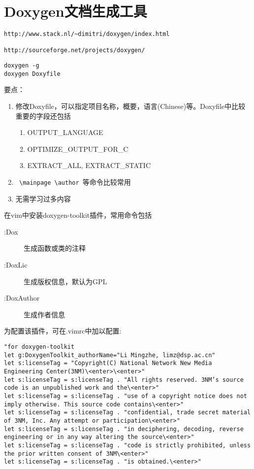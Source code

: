 \section{Doxygen文档生成工具}
\begin{verbatim}
http://www.stack.nl/~dimitri/doxygen/index.html

http://sourceforge.net/projects/doxygen/
\end{verbatim}

\begin{lstlisting}
doxygen -g
doxygen Doxyfile
\end{lstlisting}

要点：
\begin{enumerate}
	\item 修改Doxyfile，可以指定项目名称，概要，语言(Chinese)等。Doxyfile中比较重要的字段还包括
	\begin{enumerate}
		\item OUTPUT\_LANGUAGE
		\item OPTIMIZE\_OUTPUT\_FOR\_C
		\item EXTRACT\_ALL, EXTRACT\_STATIC
	\end{enumerate}
	\item \verb+ \mainpage \author +等命令比较常用
	\item 无需学习过多内容
\end{enumerate}

在vim中安装doxygen-toolkit插件，常用命令包括
\begin{description}
    \item[:Dox]生成函数或类的注释
    \item[:DoxLic]生成版权信息，默认为GPL
    \item[:DoxAuthor]生成作者信息
\end{description}

为配置该插件，可在.vimrc中加以配置:
\begin{lstlisting}
"for doxygen-toolkit
let g:DoxygenToolkit_authorName="Li Mingzhe, limz@dsp.ac.cn" 
let s:licenseTag = "Copyright(C) National Network New Media Engineering Center(3NM)\<enter>\<enter>"
let s:licenseTag = s:licenseTag . "All rights reserved. 3NM’s source code is an unpublished work and the\<enter>"
let s:licenseTag = s:licenseTag . "use of a copyright notice does not imply otherwise. This source code contains\<enter>"
let s:licenseTag = s:licenseTag . "confidential, trade secret material of 3NM, Inc. Any attempt or participation\<enter>"
let s:licenseTag = s:licenseTag . "in deciphering, decoding, reverse engineering or in any way altering the source\<enter>"
let s:licenseTag = s:licenseTag . "code is strictly prohibited, unless the prior written consent of 3NM\<enter>"
let s:licenseTag = s:licenseTag . "is obtained.\<enter>"
\end{lstlisting}



